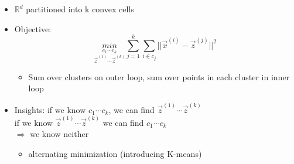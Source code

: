 \documentclass[10pt, oneside]{article}
\newcommand{\R}{\mathbb{R}}
\begin{document}
\begin{itemize}
    \item $\R^d$ partitioned into k convex cells
    \item Objective:
    \[\underset{\vec z^{(1)} \cdots \vec z^{(k)}}{\underset{c_1\cdots c_k}{min}} \sum_{j=1}^k \sum_{i\in c_j} ||\vec x^{(i)} - \vec z^{(j)}||^2\]
    \begin{itemize}
        \item Sum over clusters on outer loop, sum over points in each cluster in inner loop
    \end{itemize}
    \item Insights: if we know $c_1 \cdots c_k$, we can find $\vec z^{(1)} \cdots \vec z^{(k)}$\\if we know $\vec z^{(1)} \cdots \vec z^{(k)}$ we can find $c_1 \cdots c_k$\\$\Rightarrow$ we know neither
    \begin{itemize}
        \item alternating minimization (introducing K-means)
    \end{itemize}
\end{itemize}
\end{document}
